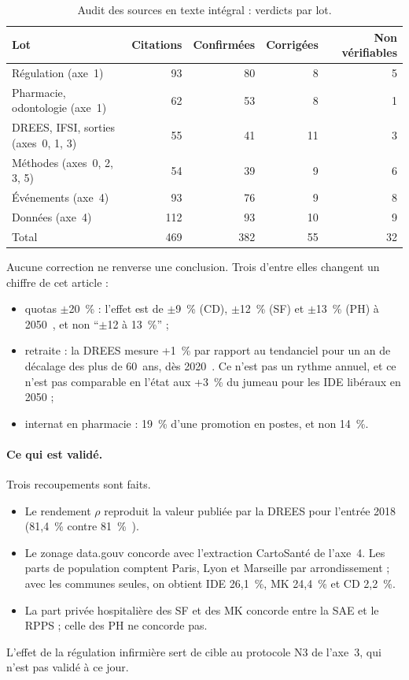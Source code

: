 \documentclass[11pt]{article}
\begin{document}
\begin{table}[htbp]
\centering\small
\caption{Audit des sources en texte intégral : verdicts par lot.}\label{tab:audit}
\begin{tabular}{lrrrr}
\toprule
Lot & Citations & Confirmées & Corrigées & Non vérifiables \\
\midrule
Régulation (axe~1) & 93 & 80 & 8 & 5 \\
Pharmacie, odontologie (axe~1) & 62 & 53 & 8 & 1 \\
DREES, IFSI, sorties (axes~0, 1, 3) & 55 & 41 & 11 & 3 \\
Méthodes (axes~0, 2, 3, 5) & 54 & 39 & 9 & 6 \\
Événements (axe~4) & 93 & 76 & 9 & 8 \\
Données (axe~4) & 112 & 93 & 10 & 9 \\
\midrule
Total & 469 & 382 & 55 & 32 \\
\bottomrule
\end{tabular}
\end{table}

Aucune correction ne renverse une conclusion. Trois d'entre elles changent
un chiffre de cet article :
\begin{itemize}
\item quotas $\pm$20~\% : l'effet est de $\pm$9~\% (CD), $\pm$12~\%
  (SF) et $\pm$13~\% (PH) à 2050~\cite{dd76}, et non \enquote{$\pm$12 à
  13~\%} ;
\item retraite : la DREES mesure +1~\% par rapport au tendanciel pour un an
  de décalage des plus de 60~ans, dès 2020~\cite{er1062,er1075}. Ce n'est
  pas un rythme annuel, et ce n'est pas comparable en l'état aux +3~\% du
  jumeau pour les IDE libéraux en 2050 ;
\item internat en pharmacie : 19~\% d'une promotion en postes, et non
  14~\%.
\end{itemize}

\paragraph{Ce qui est validé.}
Trois recoupements sont faits.
\begin{itemize}
\item Le rendement $\rho$ reproduit la valeur publiée par la DREES pour
  l'entrée 2018 (81,4~\%\mesure{} contre 81~\%~\cite{er1266}).
\item Le zonage data.gouv concorde avec l'extraction CartoSanté de l'axe~4.
  Les parts de population comptent Paris, Lyon et Marseille par
  arrondissement ; avec les communes seules, on obtient IDE 26,1~\%,
  MK 24,4~\% et CD 2,2~\%\derive.
\item La part privée hospitalière des SF et des MK concorde entre la SAE et
  le RPPS ; celle des PH ne concorde pas.
\end{itemize}
L'effet de la régulation infirmière sert de cible au protocole N3 de
l'axe~3, qui n'est pas validé à ce jour.
\end{document}
